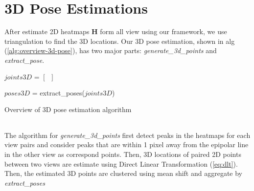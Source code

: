 \section{3D Pose Estimations}
After estimate 2D heatmaps $\mathbf{H}$ form all view using our framework, we use triangulation to find the 3D locations. Our 3D pose estimation, shown in alg (\ref{alg:overview-3d-pose}), has two major parts: \textit{generate\_3d\_points} and \textit{extract\_pose}.  
\begin{algorithm}
	\SetAlgoLined
	$joints3D$ = $[\;\;]$\;
	
	$poses3D$ = extract\_poses($joints3D$)\;
	\caption{Overview of 3D pose estimation algorithm}\label{alg:overview-3d-pose}
\end{algorithm} \\
The algorithm for \textit{generate\_3d\_points} first detect peaks in the heatmaps for each view pairs and consider peaks that are within 1 pixel away from the epipolar line in the other view as correspond points. Then, 3D locations of paired 2D points between two views are estimate using Direct Linear Transformation (\ref{eq:dlt}). Then, the estimated 3D points are clustered using mean shift and aggregate by \textit{extract\_poses}

